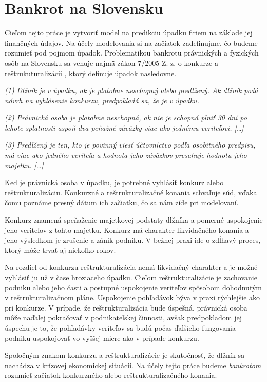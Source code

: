 \section{Bankrot na Slovensku}
\label{bankruptcy}

Cieľom tejto práce je vytvoriť model na predikciu úpadku firiem na základe jej finančných údajov.
Na účely modelovania si na začiatok zadefinujme, čo budeme rozumieť pod pojmom úpadok.
Problematikou bankrotu právnických a fyzických osôb na Slovensku sa venuje najmä zákon 7/2005 Z. z. o konkurze a reštrukuturalizácii \cite{zbierkazakonov},
ktorý definuje úpadok nasledovne.

\bigskip
\textit{(1)
Dlžník je v úpadku, ak je platobne neschopný alebo predlžený. Ak dlžník podá návrh na vyhlásenie konkurzu, predpokladá sa, že je v úpadku.}

\textit{(2)
Právnická osoba je platobne neschopná, ak nie je schopná plniť 30 dní po lehote splatnosti aspoň dva peňažné záväzky viac ako jednému veriteľovi. […]}

\textit{(3)
Predlžený je ten, kto je povinný viesť účtovníctvo podľa osobitného predpisu, má viac ako jedného veriteľa a hodnota jeho záväzkov presahuje hodnotu jeho majetku. […]}
\bigskip

Keď je právnická osoba v úpadku, je potrebné vyhlásiť konkurz alebo reštrukturalizáciu.
Konkurzné a reštrukturalizačné konania schvaľuje súd, vďaka čomu poznáme presný dátum ich začiatku, čo sa nám zíde pri modelovaní.

Konkurz znamená speňaženie majetkovej podstaty dlžníka a pomerné uspokojenie jeho veriteľov z tohto majetku.
Konkurz má charakter likvidačného konania a jeho výsledkom je zrušenie a zánik podniku.
V bežnej praxi ide o zdĺhavý proces, ktorý môže trvať aj niekoľko rokov.

Na rozdiel od konkurzu reštrukturalizácia nemá likvidačný charakter a je možné vyhlásiť ju už v čase hroziaceho úpadku.
Cieľom reštrukturalizácie je zachovanie podniku alebo jeho časti a postupné uspokojenie veriteľov spôsobom dohodnutým v reštrukturalizačnom pláne.
Uspokojenie pohľadávok býva v praxi rýchlejšie ako pri konkurze.
V prípade, že reštrukturalizácia bude úspešná, právnická osoba môže naďalej pokračovať v podnikateľskej činnosti,
avšak predpokladom jej úspechu je to, že pohľadávky veriteľov sa budú počas ďalšieho fungovania podniku uspokojovať vo vyššej miere ako v prípade konkurzu.

Spoločným znakom konkurzu a reštrukturalizácie je skutočnosť, že dlžník sa nachádza v krízovej ekonomickej situácii.
Na účely tejto práce budeme \emph{bankrotom} rozumieť začiatok konkurzného alebo reštrukturalizačného konania.

